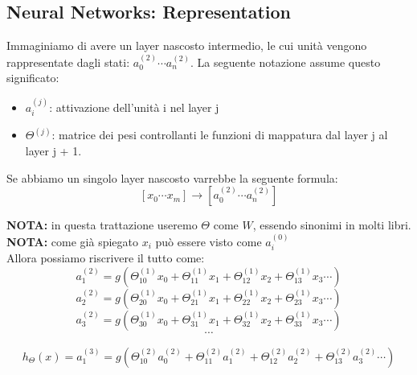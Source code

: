 \subsection{Neural Networks: Representation}
							Immaginiamo di avere un layer nascosto intermedio, le cui unità vengono rappresentate dagli stati: $a_0^{(2)} \cdots a_n^{(2)}$. La seguente notazione assume questo significato:
							 \begin{itemize}
							     \item 
							$a_i^{(j)}$: attivazione dell'unità i nel layer j
							\item
							$\Theta^{(j)}$: matrice dei pesi controllanti le funzioni di mappatura dal layer j al layer j + 1.
                            	
							 \end{itemize}						
							Se abbiamo un singolo layer nascosto varrebbe la seguente formula:
							\[[ x_0 \cdots x_m ] \to [a_0^{(2)} \cdots a_n^{(2)}] \] 
							
							\textbf{NOTA: } in questa trattazione useremo $\Theta$ come $W$, essendo sinonimi in molti libri. \\
								\textbf{NOTA: } come già spiegato $x_i$ può essere visto come $a_i^{(0)}$ \\
								
							Allora possiamo riscrivere il tutto come:
							\[a_1^{(2)} = g(\Theta_{10}^{(1)}x_0 + \Theta_{11}^{(1)}x_1 + \Theta_{12}^{(1)}x_2 + \Theta_{13}^{(1)}x_3 \cdots)\] 
							\[a_2^{(2)} = g(\Theta_{20}^{(1)}x_0 + \Theta_{21}^{(1)}x_1 + \Theta_{22}^{(1)}x_2 + \Theta_{23}^{(1)}x_3 \cdots) \]
							\[a_3^{(2)} = g(\Theta_{30}^{(1)}x_0 + \Theta_{31}^{(1)}x_1 + \Theta_{32}^{(1)}x_2 + \Theta_{33}^{(1)}x_3 \cdots) \]
														\[\cdots\]

							\[h_\Theta(x) = a_1^{(3)} = g(\Theta_{10}^{(2)}a_0^{(2)} + \Theta_{11}^{(2)}a_1^{(2)} + \Theta_{12}^{(2)}a_2^{(2)} + \Theta_{13}^{(2)}a_3^{(2)} \cdots) \]

